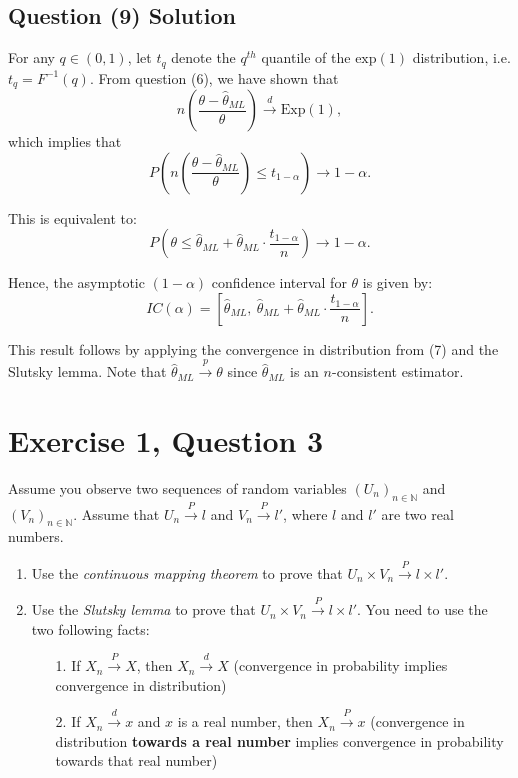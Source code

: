 \documentclass{article}
\begin{document}
\subsection{Question (9) Solution}
For any $q \in (0,1)$, let $t_q$ denote the $q^{th}$ quantile of the $\text{exp}(1)$ distribution, i.e. $t_q = F^{-1}(q)$. From question (6), we have shown that
\[
n\left(\frac{\theta - \hat{\theta}_{ML}}{\theta}\right) \xrightarrow{d} \text{Exp}(1),
\]
which implies that
\[
P\left(n\left(\frac{\theta - \hat{\theta}_{ML}}{\theta}\right) \leq t_{1-\alpha}\right) \to 1 - \alpha.
\]

This is equivalent to:
\[
P\left(\theta \leq \hat{\theta}_{ML} + \hat{\theta}_{ML} \cdot \frac{t_{1-\alpha}}{n}\right) \to 1 - \alpha.
\]

Hence, the asymptotic $(1 - \alpha)$ confidence interval for $\theta$ is given by:
\[
IC(\alpha) = \left[\hat{\theta}_{ML}, \ \hat{\theta}_{ML} + \hat{\theta}_{ML} \cdot \frac{t_{1 - \alpha}}{n} \right].
\]

This result follows by applying the convergence in distribution from (7) and the Slutsky lemma. Note that $\hat{\theta}_{ML} \xrightarrow{p} \theta$ since $\hat{\theta}_{ML}$ is an $n$-consistent estimator.

\section{Exercise 1, Question 3}
Assume you observe two sequences of random variables $(U_n)_{n \in \mathbb{N}}$ and $(V_n)_{n \in \mathbb{N}}$. Assume that $U_n \xrightarrow{P} l$ and $V_n \xrightarrow{P} l'$, where $l$ and $l'$ are two real numbers.

\begin{enumerate}
    \item Use the \textit{continuous mapping theorem} to prove that $U_n \times V_n \xrightarrow{P} l \times l'$.

    \item Use the \textit{Slutsky lemma} to prove that $U_n \times V_n \xrightarrow{P} l \times l'$. You need to use the two following facts:
    
    \begin{enumerate}
        \item[1.] If $X_n \xrightarrow{P} X$, then $X_n \xrightarrow{d} X$ (convergence in probability implies convergence in distribution)

        \item[2.] If $X_n \xrightarrow{d} x$ and $x$ is a real number, then $X_n \xrightarrow{P} x$ (convergence in distribution \textbf{towards a real number} implies convergence in probability towards that real number)
    \end{enumerate}
\end{enumerate}
\end{document}
